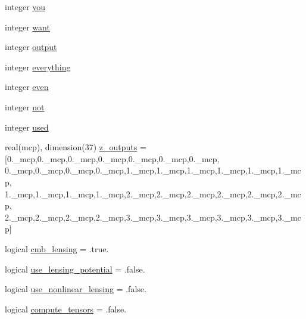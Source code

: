\begin{DoxyCompactItemize}
\item 
integer \mbox{\hyperlink{structcosmologytypes_1_1tcosmotheoryparams_abf269d4103d41e9c6703704eabadf596}{you}}
\item 
integer \mbox{\hyperlink{structcosmologytypes_1_1tcosmotheoryparams_a7222c2f263a35cc0f02b9a1ead7945e7}{want}}
\item 
integer \mbox{\hyperlink{structcosmologytypes_1_1tcosmotheoryparams_a34cb25fe601ee919f709d90e8e0307f3}{output}}
\item 
integer \mbox{\hyperlink{structcosmologytypes_1_1tcosmotheoryparams_abd17d7d4225e821ef1ebe9e950b2749a}{everything}}
\item 
integer \mbox{\hyperlink{structcosmologytypes_1_1tcosmotheoryparams_a788edad782745710882f05f788033563}{even}}
\item 
integer \mbox{\hyperlink{structcosmologytypes_1_1tcosmotheoryparams_a0a0acce676627ac9491bf32cfb65614e}{not}}
\item 
integer \mbox{\hyperlink{structcosmologytypes_1_1tcosmotheoryparams_a08c763e24839eb1bb601cb54cffdc59d}{used}}
\item 
real(mcp), dimension(37) \mbox{\hyperlink{structcosmologytypes_1_1tcosmotheoryparams_a22a82ebc1208015f9370befe9946024f}{z\+\_\+outputs}} = \mbox{[}0.\+\_\+mcp,0.\+\_\+mcp,0.\+\_\+mcp,0.\+\_\+mcp,0.\+\_\+mcp,0.\+\_\+mcp,0.\+\_\+mcp, 0.\+\_\+mcp,0.\+\_\+mcp,0.\+\_\+mcp,0.\+\_\+mcp,1.\+\_\+mcp,1.\+\_\+mcp,1.\+\_\+mcp,1.\+\_\+mcp,1.\+\_\+mcp,1.\+\_\+mcp, 1.\+\_\+mcp,1.\+\_\+mcp,1.\+\_\+mcp,1.\+\_\+mcp,2.\+\_\+mcp,2.\+\_\+mcp,2.\+\_\+mcp,2.\+\_\+mcp,2.\+\_\+mcp,2.\+\_\+mcp, 2.\+\_\+mcp,2.\+\_\+mcp,2.\+\_\+mcp,2.\+\_\+mcp,3.\+\_\+mcp,3.\+\_\+mcp,3.\+\_\+mcp,3.\+\_\+mcp,3.\+\_\+mcp,3.\+\_\+mcp\mbox{]}
\item 
logical \mbox{\hyperlink{structcosmologytypes_1_1tcosmotheoryparams_aa9b0ee9aebac37d803b04bea4f12f520}{cmb\+\_\+lensing}} = .true.
\item 
logical \mbox{\hyperlink{structcosmologytypes_1_1tcosmotheoryparams_a4c883df638ff324ab97ee47068262a6b}{use\+\_\+lensing\+\_\+potential}} = .false.
\item 
logical \mbox{\hyperlink{structcosmologytypes_1_1tcosmotheoryparams_ad241ba29af0746fcee839028ea653c53}{use\+\_\+nonlinear\+\_\+lensing}} = .false.
\item 
logical \mbox{\hyperlink{structcosmologytypes_1_1tcosmotheoryparams_aaf76c7f8ed4481231c65123ce373d21d}{compute\+\_\+tensors}} = .false.

\end{DoxyCompactItemize}
